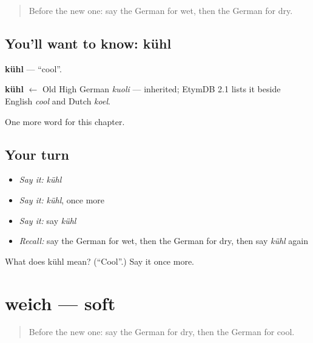 \label{lesson:GE-C135-kuehl}



\begin{quote}
Before the new one: say the German for wet, then the German for dry.
\end{quote}

\subsection*{You'll want to know: kühl}
\textbf{kühl} — \textquotedblleft{}cool\textquotedblright{}.

\begin{cousinweb}
\textbf{kühl} $\leftarrow$ Old High German \emph{kuoli} — inherited; EtymDB 2.1 lists it beside English \emph{cool} and Dutch \emph{koel}.
\end{cousinweb}

\begin{grammarlens}[title={What you've built}]
One more word for this chapter.
\end{grammarlens}

\subsection*{Your turn}
\begin{itemize}
\raggedright
  \item \emph{Say it:} \emph{kühl}
  \item \emph{Say it:} \emph{kühl}, once more
  \item \emph{Say it:} say \emph{kühl}
  \item \emph{Recall:} say the German for wet, then the German for dry, then say \emph{kühl} again
\end{itemize}

\begin{tcolorbox}[breakable,colback=teal!4,colframe=teal!35!black,title={Before you move on}]
What does kühl mean? (\textquotedblleft{}Cool\textquotedblright{}.) Say it once more.
\end{tcolorbox}
\section[weich]{weich — soft}

\label{lesson:GE-C135-weich}



\begin{quote}
Before the new one: say the German for dry, then the German for cool.
\end{quote}

